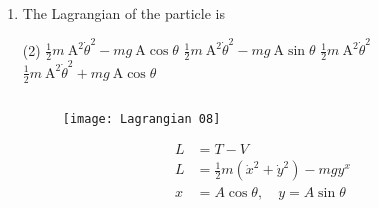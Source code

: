 \begin{enumerate}
\begin{answer}
\begin{align*}
	\text{Due to the helical symmetry, we have that }&\text{$\phi \rightarrow \phi+\zeta, z \rightarrow z+\frac{b}{2 \pi} \zeta$ is such a continuous one-parameter}
	\intertext{family of coordinate transformations. Since it leaves the combination $\phi-\frac{2 \pi z}{\dot{b}}$ unchanged, we have that $\frac{d L}{d \zeta}=0$, and}
\Lambda &=\left.p_{\rho} \frac{\partial \rho}{\partial \zeta}\right|_{\zeta=0}+\left.p_{\phi} \frac{\partial \phi}{\partial \zeta}\right|_{\zeta=0}+\left.p_{z} \frac{\partial z}{\partial \zeta}\right|_{\zeta=0} \\ &=p_{\phi}+\frac{b}{2 \pi} p_{z} \\ &=m \rho^{2} \dot{\phi}+\frac{m b}{2 \pi} \dot{z}\\
\text{is the conserved Noether 'charge'.}&\text{ The other conserved quantity is the Hamiltonian,}\\
H&=\frac{1}{2} m\left(\dot{\rho}^{2}+\rho^{2} \dot{\phi}^{2}+\dot{z}^{2}\right)+U_{0} \rho \cos \left(\phi-\frac{2 \pi z}{b}\right)
\intertext{Note that $H=T+U$ because $T$ is homogeneous of degree 2 and $U$ is homogeneous of degree 0 in the generalized velocities.} 
	\end{align*}
\end{answer}
\textbf{Statement for Linked Answer Q.12 and Q.13 :}\\
A particle of mass $m$ is constrained to move in a vertical plane along a trajectory given by $x=\mathrm{A} \cos \theta$, $y=\mathrm{A} \sin \theta$, where $\mathrm{A}$ is a constant.
\item The Lagrangian of the particle is
 \begin{tasks}(2)
	\task[\textbf{a.}]$\frac{1}{2} m \mathrm{~A}^{2} \dot{\theta}^{2}-m g \mathrm{~A} \cos \theta$
	\task[\textbf{b.}]$\frac{1}{2} m \mathrm{~A}^{2} \dot{\theta}^{2}-m g \mathrm{~A} \sin \theta$
	\task[\textbf{c.}] $\frac{1}{2} m \mathrm{~A}^{2} \dot{\theta}^{2}$
	\task[\textbf{d.}] $\frac{1}{2} m \mathrm{~A}^{2} \dot{\theta}^{2}+m g \mathrm{~A} \cos \theta$
\end{tasks}
\begin{answer}$\left. \right. $
	\begin{figure}[H]
		\centering
		\texttt{[image: Lagrangian 08]}
	\end{figure}
	\begin{align*}
	L&=T-V\\
	L&=\frac{1}{2} m\left(\dot{x}^{2}+\dot{y}^{2}\right)-m g y^{x}\\
	x&=A \cos \theta, \quad y=A \sin \theta\\

\end{align*}
\end{answer}
\end{enumerate}
